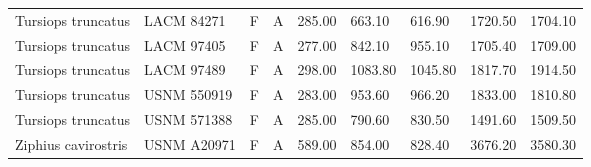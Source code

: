 \begin{longtable}{|p{1in}p{.8in}p{.25in}p{.25in}p{.5in}p{.5in}p{.5in}p{.5in}p{.55in}|}
   Tursiops truncatus & LACM 84271 & F & A & 285.00 & 663.10 & 616.90 & 1720.50 & 1704.10 \\ 
   Tursiops truncatus & LACM 97405 & F & A & 277.00 & 842.10 & 955.10 & 1705.40 & 1709.00 \\ 
   Tursiops truncatus & LACM 97489 & F & A & 298.00 & 1083.80 & 1045.80 & 1817.70 & 1914.50 \\ 
   Tursiops truncatus & USNM 550919 & F & A & 283.00 & 953.60 & 966.20 & 1833.00 & 1810.80 \\ 
   Tursiops truncatus & USNM 571388 & F & A & 285.00 & 790.60 & 830.50 & 1491.60 & 1509.50 \\ 
   Ziphius cavirostris & USNM A20971 & F & A & 589.00 & 854.00 & 828.40 & 3676.20 & 3580.30 \\ 
   \hline
\end{longtable}

\normalfont
